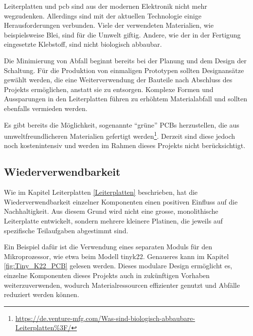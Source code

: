 Leiterplatten und \acrfull{pcb} sind aus der modernen Elektronik nicht mehr wegzudenken. Allerdings sind mit der aktuellen Technologie einige Herausforderungen verbunden. Viele der verwendeten Materialien, wie beispielsweise Blei, sind für die Umwelt giftig. Andere, wie der in der Fertigung eingesetzte Klebstoff, sind nicht biologisch abbaubar.

Die Minimierung von Abfall beginnt bereits bei der Planung und dem Design der Schaltung. Für die Produktion von einmaligen Prototypen sollten Designansätze gewählt werden, die eine Weiterverwendung der Bauteile nach Abschluss des Projekts ermöglichen, anstatt sie zu entsorgen. Komplexe Formen und Aussparungen in den Leiterplatten führen zu erhöhtem Materialabfall und sollten ebenfalls vermieden werden.

Es gibt bereits die Möglichkeit, sogenannte ``grüne'' PCBs herzustellen, die aus umweltfreundlicheren Materialien gefertigt werden\footnote{\url{https://de.venture-mfg.com/Was-sind-biologisch-abbaubare-Leiterplatten\%3F/}}.  Derzeit sind diese jedoch noch kostenintensiv und werden im Rahmen dieses Projekts nicht berücksichtigt.

\subsection{Wiederverwendbarkeit}

Wie im Kapitel Leiterplatten \ref{Leiterplatten} beschrieben, hat die Wiederverwendbarkeit einzelner Komponenten einen positiven Einfluss auf die Nachhaltigkeit. Aus diesem Grund wird nicht eine grosse, monolithische Leiterplatte entwickelt, sondern mehrere kleinere Platinen, die jeweils auf spezifische Teilaufgaben abgestimmt sind.

Ein Beispiel dafür ist die Verwendung eines separaten Moduls für den Mikroprozessor, wie etwa beim Modell \gls{tinyk22}. Genaueres kann im Kapitel \ref{fig:Tiny_K22_PCB} gelesen werden. Dieses modulare Design ermöglicht es, einzelne Komponenten dieses Projekts auch in zukünftigen Vorhaben weiterzuverwenden, wodurch Materialressourcen effizienter genutzt und Abfälle reduziert werden können.




